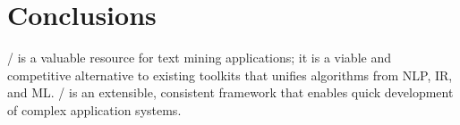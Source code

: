 \section{Conclusions}

\meta/ is a valuable resource for text mining applications; it is a viable and
competitive alternative to existing toolkits that unifies algorithms from NLP,
IR, and ML\@. \meta/ is an extensible, consistent framework that enables quick
development of complex application systems.
